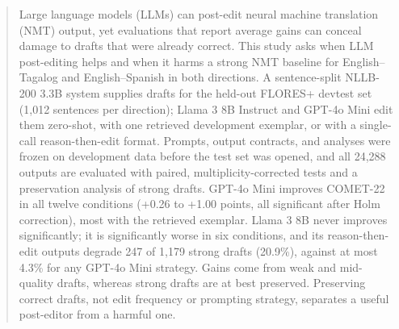\begin{abstract}
Large language models (LLMs) can post-edit neural machine translation (NMT) output, yet evaluations that report average gains can conceal damage to drafts that were already correct. This study asks when LLM post-editing helps and when it harms a strong NMT baseline for English--Tagalog and English--Spanish in both directions. A sentence-split NLLB-200 3.3B system supplies drafts for the held-out FLORES+ devtest set (1{,}012 sentences per direction); Llama 3 8B Instruct and GPT-4o Mini edit them zero-shot, with one retrieved development exemplar, or with a single-call reason-then-edit format. Prompts, output contracts, and analyses were frozen on development data before the test set was opened, and all 24{,}288 outputs are evaluated with paired, multiplicity-corrected tests and a preservation analysis of strong drafts. GPT-4o Mini improves COMET-22 in all twelve conditions (+0.26 to +1.00 points, all significant after Holm correction), most with the retrieved exemplar. Llama 3 8B never improves significantly; it is significantly worse in six conditions, and its reason-then-edit outputs degrade 247 of 1{,}179 strong drafts (20.9\%), against at most 4.3\% for any GPT-4o Mini strategy. Gains come from weak and mid-quality drafts, whereas strong drafts are at best preserved. Preserving correct drafts, not edit frequency or prompting strategy, separates a useful post-editor from a harmful one.
\end{abstract}
